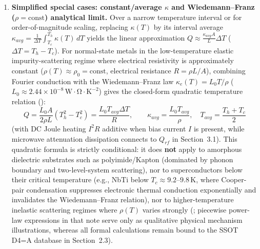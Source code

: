 \documentclass[11pt,a4paper]{article}
\begin{document}
\begin{enumerate}[leftmargin=*]
\item \textbf{Simplified special cases: constant/average $\kappa$ and Wiedemann--Franz ($\rho=\mathrm{const}$) analytical limit.} Over a narrow temperature interval or for order-of-magnitude scaling, replacing $\kappa(T)$ by its interval average $\kappa_{avg}=\frac{1}{\Delta T}\int_{T_c}^{T_h}\kappa(T)\,dT$ yields the linear approximation $Q \approx \frac{\kappa_{avg}A}{L}\Delta T$ ($\Delta T = T_h - T_c$). For normal-state metals in the low-temperature elastic impurity-scattering regime where electrical resistivity is approximately constant ($\rho(T)\approx \rho_0=\mathrm{const}$, electrical resistance $R=\rho L/A$), combining Fourier conduction with the Wiedemann--Franz law $\kappa_e(T) = L_0 T/\rho$ ($L_0 \approx 2.44\times 10^{-8}\,\mathrm{W\cdot\Omega\cdot K^{-2}}$) gives the closed-form quadratic temperature relation ():
\begin{equation}
Q = \frac{L_0 A}{2\rho L}\left(T_h^2 - T_c^2\right) = \frac{L_0 T_{avg}\Delta T}{R}, \qquad \kappa_{avg} = \frac{L_0 T_{avg}}{\rho}, \quad T_{avg}=\frac{T_h+T_c}{2}
\end{equation}
(with DC Joule heating $I^2 R$ additive when bias current $I$ is present, while microwave attenuation dissipation connects to $Q_{rf}$ in Section~3.1). This quadratic formula is strictly conditional: it does \textbf{not} apply to amorphous dielectric substrates such as polyimide/Kapton (dominated by phonon boundary and two-level-system scattering), nor to superconductors below their critical temperature (e.g., NbTi below $T_c \approx 9.2\text{--}9.8\,\mathrm{K}$, where Cooper-pair condensation suppresses electronic thermal conduction exponentially and invalidates the Wiedemann--Franz relation), nor to higher-temperature inelastic scattering regimes where $\rho(T)$ varies strongly (; piecewise power-law expressions in that note serve only as qualitative physical mechanism illustrations, whereas all formal calculations remain bound to the SSOT D4=A database in Section~2.3).


\end{enumerate}
\end{document}

